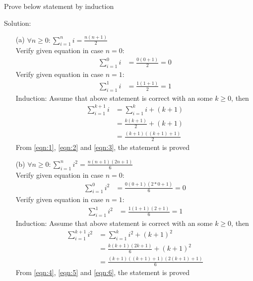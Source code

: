 \newpage
\begin{longfbox}
    \begin{bt} \label{pro:practice2.44}
        Prove below statement by induction
    \end{bt}
\end{longfbox}
Solution:
\begin{enumerate}
    \item[(a)] $\forall n\geq 0: \displaystyle\sum^{n}_{i=1} i = \frac{n(n+1)}{2}$ \\
        Verify given equation in case $n=0$:
            \begin{align}
                \displaystyle\sum^{0}_{i=1} i &= \frac{0(0+1)}{2} = 0 \label{eqn:1}
            \end{align}
        Verify given equation in case $n=1$:
            \begin{align}
                \displaystyle\sum^{1}_{i=1} i &= \frac{1(1+1)}{2} = 1 \label{eqn:2}
            \end{align}
        Induction: Assume that above statement is correct with an some $k \geq 0$, then\\
        \begin{align}
            \displaystyle\sum^{k+1}_{i=1} i &= \displaystyle\sum^{k}_{i=1} i + (k+1) \\
                                            &= \frac{k(k+1)}{2} + (k+1) \\
                                            &= \frac{(k+1)((k+1)+1)}{2} \label{eqn:3}
        \end{align}
        From \ref{eqn:1}, \ref{eqn:2} and \ref{eqn:3}, the statement is proved
    
    \item[(b)] $\forall n\geq 0: \displaystyle\sum^{n}_{i=1} i^2 = \frac{n(n+1)(2n+1)}{6}$ \\
        Verify given equation in case $n=0$:
            \begin{align}
                \displaystyle\sum^{0}_{i=1} i^2 &= \frac{0(0+1)(2*0+1)}{6} = 0 \label{eqn:4}
            \end{align}
        Verify given equation in case $n=1$:
            \begin{align}
                \displaystyle\sum^{1}_{i=1} i^2 &= \frac{1(1+1)(2+1)}{6} = 1 \label{eqn:5}
            \end{align}
        Induction: Assume that above statement is correct with an some $k \geq 0$, then\\
        \begin{align}
            \displaystyle\sum^{k+1}_{i=1} i^2 &= \displaystyle\sum^{k}_{i=1} i^2 + (k+1)^2 \\
                                            &= \frac{k(k+1)(2k+1)}{6} + (k+1)^2 \\
                                            &= \frac{(k+1)((k+1)+1)(2(k+1)+1)}{6} \label{eqn:6}
        \end{align}
        From \ref{eqn:4}, \ref{eqn:5} and \ref{eqn:6}, the statement is proved
    

\end{enumerate}
